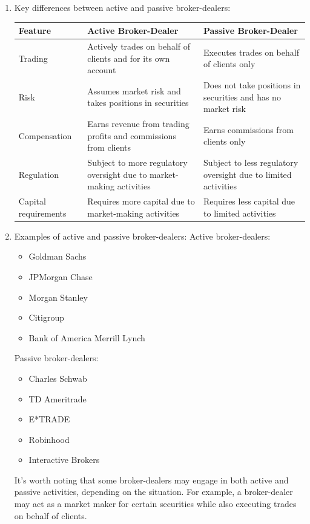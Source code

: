 \documentclass[11pt]{article}
\begin{document}
\begin{enumerate}
\item Key differences between active and passive broker-dealers:
\label{sec:orgb295113}

\begin{center}
\begin{tabular}{lll}
\hline
Feature & Active Broker-Dealer & Passive Broker-Dealer\\[0pt]
\hline
Trading & Actively trades on behalf of clients and for its own account & Executes trades on behalf of clients only\\[0pt]
Risk & Assumes market risk and takes positions in securities & Does not take positions in securities and has no market risk\\[0pt]
Compensation & Earns revenue from trading profits and commissions from clients & Earns commissions from clients only\\[0pt]
Regulation & Subject to more regulatory oversight due to market-making activities & Subject to less regulatory oversight due to limited activities\\[0pt]
Capital requirements & Requires more capital due to market-making activities & Requires less capital due to limited activities\\[0pt]
\hline
\end{tabular}
\end{center}

\item Examples of active and passive broker-dealers:
\label{sec:orgd44242d}
Active broker-dealers:
\begin{itemize}
\item Goldman Sachs
\item JPMorgan Chase
\item Morgan Stanley
\item Citigroup
\item Bank of America Merrill Lynch
\end{itemize}

Passive broker-dealers:
\begin{itemize}
\item Charles Schwab
\item TD Ameritrade
\item E*TRADE
\item Robinhood
\item Interactive Brokers
\end{itemize}

It's worth noting that some broker-dealers may engage in both active and passive activities, depending on the situation.
For example, a broker-dealer may act as a market maker for certain securities while also executing trades on behalf of clients.
\end{enumerate}
\end{document}
